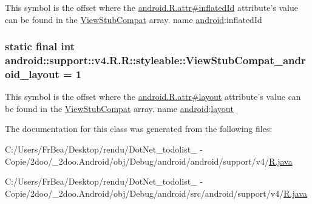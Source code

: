 This symbol is the offset where the \hyperlink{}{android.R.attr\#inflatedId} attribute's value can be found in the \hyperlink{classandroid_1_1support_1_1v4_1_1_r_1_1styleable_2b14c683a11161f4740b13eb80af9370}{ViewStubCompat} array.  name \hyperlink{namespaceandroid}{android}:inflatedId \hypertarget{classandroid_1_1support_1_1v4_1_1_r_1_1styleable_e4052db577a557ecc97dc5c3f81aabd7}{
\subsubsection[{ViewStubCompat\_\-android\_\-layout}]{\setlength{\rightskip}{0pt plus 5cm}static final int android::support::v4.R.R::styleable::ViewStubCompat\_\-android\_\-layout = 1}}
\label{classandroid_1_1support_1_1v4_1_1_r_1_1styleable_e4052db577a557ecc97dc5c3f81aabd7}


This symbol is the offset where the \hyperlink{}{android.R.attr\#layout} attribute's value can be found in the \hyperlink{classandroid_1_1support_1_1v4_1_1_r_1_1styleable_2b14c683a11161f4740b13eb80af9370}{ViewStubCompat} array.  name \hyperlink{namespaceandroid}{android}:\hyperlink{classandroid_1_1support_1_1v4_1_1_r_1_1layout}{layout} 

The documentation for this class was generated from the following files:\begin{CompactItemize}
\item 
C:/Users/FrBea/Desktop/rendu/DotNet\_\-todolist\_ - Copie/2doo/\_\-2doo.Android/obj/Debug/android/android/support/v4/\hyperlink{android_2support_2v4_2_r_8java}{R.java}\item 
C:/Users/FrBea/Desktop/rendu/DotNet\_\-todolist\_ - Copie/2doo/\_\-2doo.Android/obj/Debug/android/src/android/support/v4/\hyperlink{src_2android_2support_2v4_2_r_8java}{R.java}\end{CompactItemize}
